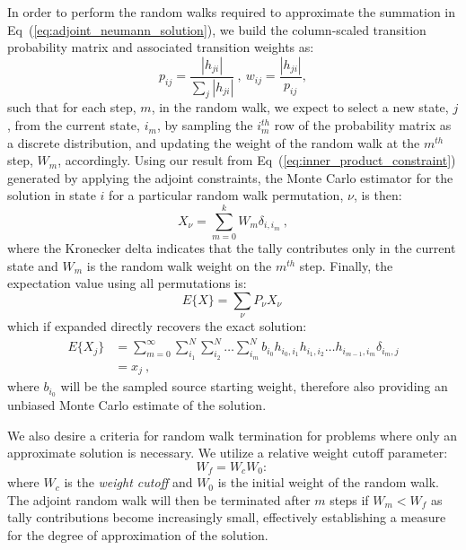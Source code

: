 \documentclass[preprint,11pt]{elsarticle}
\begin{document}
In order to perform the random walks required to approximate the
summation in Eq~(\ref{eq:adjoint_neumann_solution}), we build the
column-scaled transition probability matrix and associated transition
weights as:
\begin{equation}
  p_{ij} = \frac{|h_{ji}|}{\sum_j |h_{ji}|}\:,\ w_{ij} =
  \frac{|h_{ji}|}{p_{ij}},
  \label{eq:adjoint_probability}
\end{equation}
such that for each step, $m$, in the random walk, we expect to select a new
state, $j$, from the current state, $i_m$, by sampling the $i_m^{th}$ row of
the probability matrix as a discrete distribution, and updating the weight of
the random walk at the $m^{th}$ step, $W_m$, accordingly.  Using our result
from Eq~(\ref{eq:inner_product_constraint}) generated by applying the adjoint
constraints, the Monte Carlo estimator for the solution in state $i$ for a
particular random walk permutation, $\nu$, is then:
\begin{equation}
  X_{\nu} = \sum_{m=0}^k W_{m} \delta_{i,i_m}\:,
  \label{eq:adjoint_permutation_contribution}
\end{equation}
where the Kronecker delta indicates that the tally contributes only in the
current state and $W_m$ is the random walk weight on the $m^{th}$
step. Finally, the expectation value using all permutations is:
\begin{equation}
  E\{X\} = \sum_{\nu} P_{\nu} X_{\nu}\:
  \label{eq:adjoint_expectation_value}
\end{equation}
which if expanded directly recovers the exact solution:
\begin{equation}
  \begin{split}
    E\{X_j\} &=\sum_{m=0}^{\infty}\sum_{i_1}^{N}\sum_{i_2}^{N}\ldots
    \sum_{i_m}^{N} b_{i_0} h_{i_0,i_1}h_{i_1,i_2}\ldots
    h_{i_{m-1},i_m} \delta_{i_m,j} \\ &= x_{j}\:,
  \end{split}
  \label{eq:adjoint_expectation_expansion}
\end{equation}
where $b_{i_0}$ will be the sampled source starting weight, therefore
also providing an unbiased Monte Carlo estimate of the solution.

We also desire a criteria for random walk termination for problems where only
an approximate solution is necessary. We utilize a relative weight cutoff
parameter:
\begin{equation}
  W_f = W_c W_0:\,
  \label{eq:relative_weight_cutoff}
\end{equation}
where $W_c$ is the \textit{weight cutoff} and $W_0$ is the initial weight of
the random walk. The adjoint random walk will then be terminated after $m$
steps if $W_m < W_f$ as tally contributions become increasingly small,
effectively establishing a measure for the degree of approximation of the
solution.
\end{document}
